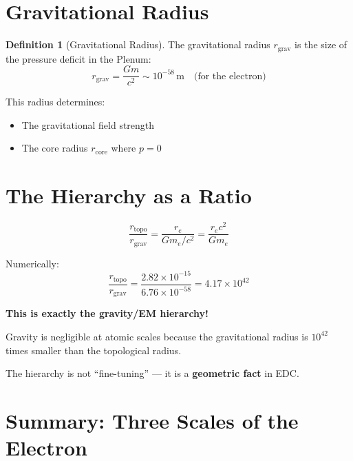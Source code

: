\documentclass[12pt,a4paper,openany]{book}
\theoremstyle{definition}
\newtheorem{definition}{Definition}[chapter]
\theoremstyle{plain}
\theoremstyle{remark}
\newcommand{\re}{r_e}                      %
\newcommand{\rcore}{r_{\text{core}}}       %
\newcommand{\rtopo}{r_{\text{topo}}}       %
\newcommand{\rgrav}{r_{\text{grav}}}       %
\begin{document}
\section{Gravitational Radius}

\begin{definition}[Gravitational Radius]
The gravitational radius $\rgrav$ is the size of the pressure deficit in the Plenum:
\begin{equation}
\rgrav = \frac{Gm}{c^2} \sim 10^{-58}\,\text{m} \quad \text{(for the electron)}
\label{eq:rgrav}
\end{equation}
\end{definition}

This radius determines:
\begin{itemize}
    \item The gravitational field strength
    \item The core radius $\rcore$ where $p = 0$
\end{itemize}

\section{The Hierarchy as a Ratio}

\begin{derivedbox}
\begin{equation}
\frac{\rtopo}{\rgrav} = \frac{\re}{Gm_e/c^2} = \frac{\re c^2}{Gm_e}
\end{equation}

Numerically:
\begin{equation}
\frac{\rtopo}{\rgrav} = \frac{2.82 \times 10^{-15}}{6.76 \times 10^{-58}} = 4.17 \times 10^{42}
\end{equation}

\textbf{This is exactly the gravity/EM hierarchy!}
\end{derivedbox}

\begin{identifiedbox}
Gravity is negligible at atomic scales because the gravitational radius is $10^{42}$ times smaller than the topological radius.

The hierarchy is not ``fine-tuning'' — it is a \textbf{geometric fact} in EDC.
\end{identifiedbox}

\section{Summary: Three Scales of the Electron}
\end{document}
